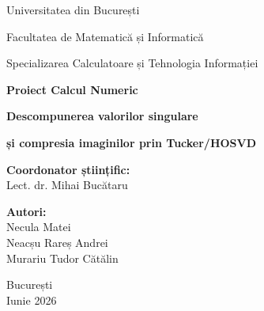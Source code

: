 \documentclass[12pt,a4paper]{article}
\theoremstyle{definition}
\begin{document}
\hypersetup{pageanchor=false}

\begin{titlepage}
\centering

{\large Universitatea din București\par}
\vspace{0.35cm}
{\large Facultatea de Matematică și Informatică\par}
\vspace{0.35cm}
{\large Specializarea Calculatoare și Tehnologia Informației\par}

\vspace{3.2cm}

{\Large \textbf{Proiect Calcul Numeric}\par}
\vspace{1.2cm}
{\huge \textbf{Descompunerea valorilor singulare}\par}
\vspace{0.35cm}
{\huge \textbf{și compresia imaginilor prin Tucker/HOSVD}\par}

\vspace{3.4cm}

\begin{minipage}{0.82\textwidth}
\begin{flushleft}
\textbf{Coordonator științific:}\\
Lect. dr. Mihai Bucătaru
\end{flushleft}

\vspace{1.1cm}

\begin{flushleft}
\textbf{Autori:}\\
Necula Matei\\
Neacșu Rareș Andrei\\
Murariu Tudor Cătălin
\end{flushleft}
\end{minipage}

\vfill

{\large București}\\
{\large Iunie 2026}

\end{titlepage}

\hypersetup{pageanchor=true}

\begin{abstract}
Acest proiect implementează manual descompunerea valorilor singulare (SVD), fără folosirea funcțiilor NumPy predefinite pentru descompuneri, diagonalizări sau factorizări în codul principal. SVD-ul este apoi folosit în algoritmul HOSVD pentru obținerea unei descompuneri Tucker pe blocuri de imagine. Aplicația finală permite compresia imaginilor, reconstrucția lor și evaluarea raportului de compresie, a erorii relative și a timpului de execuție.
\end{abstract}
\end{document}
